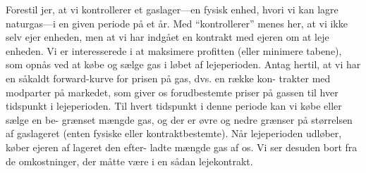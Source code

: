 Forestil jer, at vi kontrollerer et gaslager—en fysisk enhed, hvori vi kan lagre naturgas—i en given periode på et år. Med “kontrollerer” menes her, at vi ikke selv ejer enheden, men at vi har indgået en kontrakt med ejeren om at leje enheden. Vi er interesserede i at maksimere profitten (eller minimere tabene), som opnås ved at købe og sælge gas i løbet af lejeperioden.
Antag hertil, at vi har en såkaldt forward-kurve for prisen på gas, dvs. en række kon- trakter med modparter på markedet, som giver os forudbestemte priser på gassen til hver tidspunkt i lejeperioden. Til hvert tidspunkt i denne periode kan vi købe eller sælge en be- grænset mængde gas, og der er øvre og nedre grænser på størrelsen af gaslageret (enten fysiske eller kontraktbestemte). Når lejeperioden udløber, køber ejeren af lageret den efter- ladte mængde gas af os. Vi ser desuden bort fra de omkostninger, der måtte være i en sådan lejekontrakt.